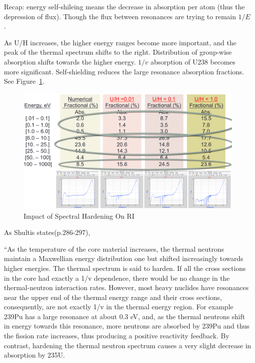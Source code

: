 \documentclass{school-22.211-notes}
\begin{document}
Recap: energy self-shileing means the decrease in absorption per atom (thus the depression of flux). Though the flux between resonances are trying to remain $1/E$. 

\clearpage
\label{spectral-hardening-section}
As U/H increases, the higher energy ranges become more important, and the peak of the thermal spectrum shifts to the right. Distribution of group-wise absorption shifts towards the higher energy. $1/v$ absorption of U238 becomes more significant. Self-shielding reduces the large resonance absorption fractions. See Figure~\ref{spectral-hardening}. 
\begin{figure}[ht]
  \centering
  \includegraphics[width=6in]{images/r-m/spectral-hardening.png}
  \caption{Impact of Spectral Hardening On RI} \label{spectral-hardening}
\end{figure}

As Shultis states(p.286-297),

``As the temperature of the core material increases, the thermal neutrons maintain a Maxwellian energy distribution one but shifted increasingly towards higher energies. The thermal spectrum is said to harden. If all the cross sections in the core
had exactly a 1/v dependence, there would be no change in the thermal-neutron
interaction rates. However, most heavy nuclides have resonances near the upper end
of the thermal energy range and their cross sections, consequently, are not exactly
1/v in the thermal energy region. For example 239Pu has a large resonance at about 0.3 eV, and, as the thermal neutrons shift in energy towards this resonance, more neutrons are absorbed by 239Pu and thus the fission rate increases, thus producing a positive reactivity feedback. By contrast, hardening the thermal neutron spectrum causes a very slight decrease in absorption by 235U. 
\end{document}
